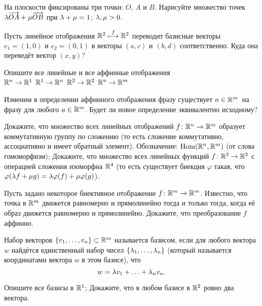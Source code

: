 \documentclass[a4paper,12pt]{scrartcl}
\newcommand{\wa}{\overrightarrow}
\begin{document}
На плоскости фиксированы три точки: $O$, $A$ и $B$. Нарисуйте множество точек $\la \wa{OA}+\mu\wa{OB}$ при  $\lambda+\mu = 1$;  $\lambda,\mu>0$.


  Пусть линейное отображения $\mathbb{R}^2\stackrel{f}{\longmapsto}\mathbb{R}^2$ переводит базисные векторы
  $e_1=(1,0)$ и $e_2=(0,1)$ в векторы $(a,c)$ и $(b,d)$ соответственно.
  Куда она переведёт вектор $(x,y)$?

  Опишите все линейные и все аффинные отображения\\
   $\mathbb{R}^n\rightarrow\mathbb{R}^1$\hfill
   $\mathbb{R}^1\rightarrow\mathbb{R}^n$\hfill
   $\mathbb{R}^2\rightarrow\mathbb{R}^2$\hfill
   $\mathbb{R}^n\rightarrow\mathbb{R}^m$

  Изменим в определении аффинного отображения фразу  существует
  $a\in\mathbb{R}^m$\ на фразу  для любого $a\in\mathbb{R}^m$. Будет ли
  новое определение эквивалентно исходному?


Докажите, что множество всех линейных отображений $f\colon\mathbb{R}^n\rightarrow\mathbb{R}^m$ образует коммутативную группу по сложению (то есть сложение коммутативно, ассоциативно и имеет обратный элемент). Обозначение: $\operatorname{Hom}(\mathbb{R}^n,\mathbb{R}^m)$ (от слова  гомоморфизм);
Докажите, что множество всех линейных функций $f\colon\mathbb{R}^2\rightarrow\mathbb{R}^2$ с операцией сложения изоморфна $\mathbb{R}^4$ (то есть существует биекция $\varphi$ такая, что $\varphi(\lambda f + \mu g) = \lambda\varphi(f) + \mu\varphi(g)$).

Пусть задано некоторое биективное отображение $f\colon \mathbb{R}^m\rightarrow\mathbb{R}^m$. Известно, что точка в $\mathbb{R}^m$ движется равномерно и прямолинейно тогда и только тогда, когда её образ движется равномерно и прямолинейно. Докажите, что преобразование $f$ аффинно.

Набор векторов $\left\{v_1,\ldots, v_n\right\}\subset\mathbb{R}^m$ называется базисом, если для любого вектора $w$ найдётся единственный набор чисел $\left\{\lambda_1,\ldots,\lambda_n\right\}$ (который называется координатами вектора $w$ в этом базисе), что
$$w = \lambda v_1 + \ldots + \lambda_n v_n.$$

Опишите все базисы в $\mathbb{R}^1$;
Докажите, что в любом базисе в $\mathbb{R}^2$ ровно два вектора.






\end{document}
